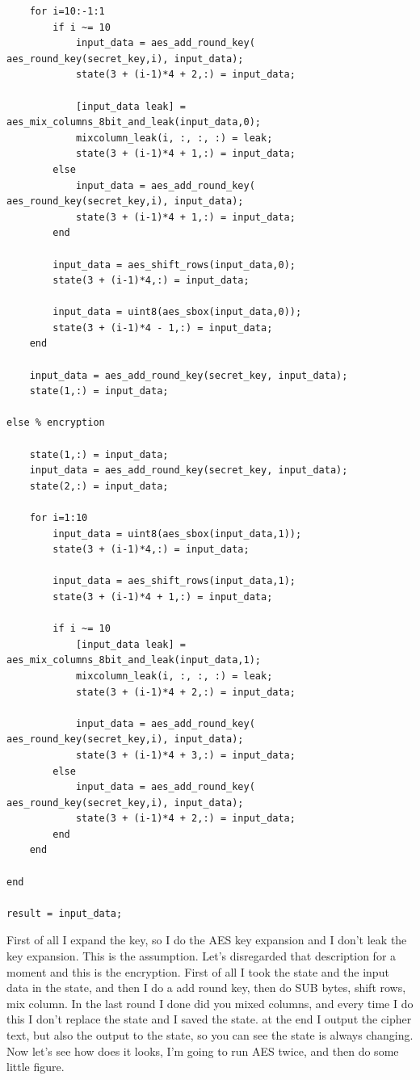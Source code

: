 \begin{verbatim}
    for i=10:-1:1
        if i ~= 10
            input_data = aes_add_round_key( aes_round_key(secret_key,i), input_data);
            state(3 + (i-1)*4 + 2,:) = input_data;

            [input_data leak] = aes_mix_columns_8bit_and_leak(input_data,0);
            mixcolumn_leak(i, :, :, :) = leak;
            state(3 + (i-1)*4 + 1,:) = input_data;
        else
            input_data = aes_add_round_key( aes_round_key(secret_key,i), input_data);
            state(3 + (i-1)*4 + 1,:) = input_data;
        end

        input_data = aes_shift_rows(input_data,0);
        state(3 + (i-1)*4,:) = input_data;

        input_data = uint8(aes_sbox(input_data,0));
        state(3 + (i-1)*4 - 1,:) = input_data;
    end

    input_data = aes_add_round_key(secret_key, input_data);
    state(1,:) = input_data;

else % encryption

    state(1,:) = input_data;
    input_data = aes_add_round_key(secret_key, input_data);
    state(2,:) = input_data;
    
    for i=1:10
        input_data = uint8(aes_sbox(input_data,1));
        state(3 + (i-1)*4,:) = input_data;

        input_data = aes_shift_rows(input_data,1);
        state(3 + (i-1)*4 + 1,:) = input_data;

        if i ~= 10
            [input_data leak] = aes_mix_columns_8bit_and_leak(input_data,1);
            mixcolumn_leak(i, :, :, :) = leak;
            state(3 + (i-1)*4 + 2,:) = input_data;

            input_data = aes_add_round_key( aes_round_key(secret_key,i), input_data);
            state(3 + (i-1)*4 + 3,:) = input_data;
        else
            input_data = aes_add_round_key( aes_round_key(secret_key,i), input_data);
            state(3 + (i-1)*4 + 2,:) = input_data;
        end
    end
            
end

result = input_data;

\end{verbatim}

First of all I expand the key, so I do the AES key expansion and I don't leak
the key expansion. This is the assumption. Let's disregarded that description
for a moment and this is the encryption. First of all I took the state and the
input data in the state, and then I do a add round key, then do SUB bytes, shift
rows, mix column. In the last round I done did you mixed columns, and every time
I do this I don't replace the state and I saved the state. at the end I output
the cipher text, but also the output to the state, so you can see the state is
always changing. Now let's see how does it looks, I'm going to run AES twice,
and then do some little figure.

